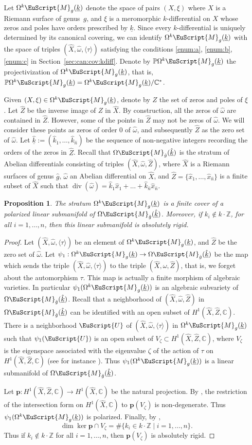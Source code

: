\documentclass[JEP,XML,SOM,Unicode]{cedram}
\let\mathcal\EuScript
\DeclareMathOperator{\Div}{div}
\theoremstyle{plain}
\newtheorem{Proposition}[Theorem]{Proposition}
\theoremstyle{definition}
\def\C{\mathbb{C}}
\newcommand\Z{\mathbb{Z}}
\newcommand{\Pb}{\mathbb{P}}
\newcommand{\pp}{\boldsymbol{p}}
\newcommand{\Mcal}{\mathcal{M}}
\newcommand{\Ucal}{\mathcal{U}}
\newcommand{\hg}{\hat{g}}
\newcommand{\hn}{\hat{n}}
\newcommand{\hx}{\hat{x}}
\newcommand{\hX}{\hat{X}}
\newcommand{\hZ}{\hat{Z}}
\newcommand{\homg}{\hat{\omega}}
\newcommand{\hk}{\hat{k}}
\let\ul\underline
\newcommand{\Skdiff}{\Omega^k\mathcal{M}_{g}(\ul{k})}
\newcommand{\Sabel}{\Omega\Mcal_{\hat{g}}(\ul{\hat{k}})}
\newcommand{\pSkdiff}{\Pb\Omega^k\mathcal{M}_{g}(\ul{k})}
\begin{document}
Let $\Skdiff$ denote the space of pairs $(X,\xi)$ where $X$ is a Riemann surface of genus~$g$, and $\xi$ is a meromorphic $k$-differential on $X$ whose zeros and poles have orders prescribed by $\ul{k}$.
Since every $k$-differential is uniquely determined by its canonical covering, we can identify $\Skdiff$ with the space of triples $(\hX,\homg,\langle\tau\rangle)$ satisfying the conditions \eqref{enum:a}, \eqref{enum:b}, \eqref{enum:c} in Section~\ref{sec:can:cov:kdiff}.
Denote by $\pSkdiff$ the projectivization of $\Skdiff$, that is, $\pSkdiff=\Skdiff/\C^*$.

Given $(X,\xi)\in \Skdiff$, denote by $Z$ the set of zeros and poles of $\xi$. Let $\hZ$ be the inverse image of $Z$ in $\hX$. By construction, all the zeros of $\homg$ are contained in $\hZ$.
However, some of the points in $\hZ$ may not be zeros of $\homg$. We will consider these points as zeros of order $0$ of $\homg$, and subsequently $\hZ$ as the zero set of $\homg$.
Let $\ul{\hk}:=(\hk_1,\dots,\hk_{\hn})$ be the sequence of non-negative integers recording the orders of the zeros in $\hZ$.
Recall that $\Sabel$ is the stratum of Abelian differentials consisting of triples $(\hX,\homg,\hZ)$, where $\hX$ is a Riemann surfaces of genus $\hg$, $\homg$ an Abelian differential on $\hX$, and $\hZ=\{\hx_1,\dots,\hx_{\hn}\}$ is a finite subset of $\hX$ such that $\Div(\homg)=\hk_1\hx_1+\dots+\hk_{\hn}\hx_{\hn}$.

\begin{Proposition}\label{prop:kdiff:ln:man}
The stratum $\Skdiff$ is a finite cover of a polarized linear submanifold of $\Sabel$. Moreover, if $k_i\not\in k\cdot\Z$, for all $i=1,\dots,n$, then this linear submanifold is absolutely rigid.
\end{Proposition}
\begin{proof}
Let $(\hX,\homg,\langle\tau\rangle)$ be an element of $\Skdiff$, and $\hZ$ be the zero set of $\homg$. Let $\psi_1: \Skdiff \to \Sabel$ be the map which sends the triple $(\hX,\homg,\langle \tau \rangle)$ to the triple $(\hX,\homg,\hZ)$, that is, we forget about the automorphism $\tau$. This map is actually a finite morphism of algebraic varieties. In particular $\psi_1(\Skdiff)$ is an algebraic subvariety of $\Sabel$.
Recall that a neighborhood of $(\hX,\homg,\hZ)$ in $\Sabel$ can be identified with an open subset of $H^1(\hX,\hZ,\C)$.
There is a neighborhood $\Ucal$ of $(\hX,\homg,\langle\tau\rangle)$ in $\Skdiff$ such that $\psi_1(\Ucal)$ is an open subset of $V_\zeta \subset H^1(\hX,\hZ,\C)$, where $V_\zeta$ is the eigenspace associated with the eigenvalue $\zeta$ of the action of $\tau$ on $H^1(\hX,\hZ,\C)$ (see for instance \cite{BCGGM:kdiff, Ngu19}). Thus $\psi_1(\Skdiff)$ is a linear submanifold of $\Sabel$.

Let $\pp: H^1(\hX,\hZ,\C) \to H^1(\hX,\C)$ be the natural projection. By \cite[Prop.\,5.1]{Ngu19}, the restriction of the intersection form on $H^1(\hX,\C)$ to $\pp(V_\zeta)$ is non-degenerate. Thus $\psi_1(\Skdiff)$ is polarized. Finally, by \cite[Prop.\,4.1]{Ngu19},
\[
\dim \ker\pp\cap V_\zeta = \#\{k_i\in k\cdot\Z\mid i=1,\dots,n\}.
\]
Thus if $k_i\not\in k\cdot\Z$ for all $i=1,\dots,n$, then $\pp(V_\zeta)$ is absolutely rigid.
\end{proof}
\end{document}
